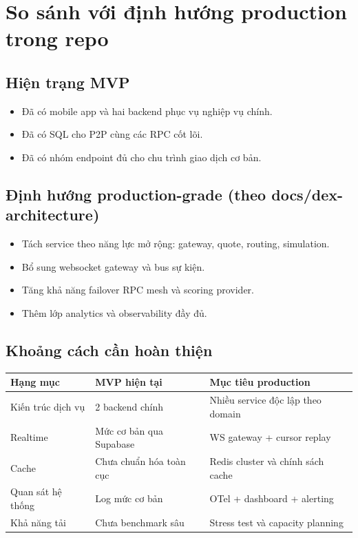 \documentclass[a4paper,12pt]{report}
\begin{document}
\chapter{So sánh với định hướng production trong repo}

\section{Hiện trạng MVP}
\begin{itemize}
    \item Đã có mobile app và hai backend phục vụ nghiệp vụ chính.
    \item Đã có SQL cho P2P cùng các RPC cốt lõi.
    \item Đã có nhóm endpoint đủ cho chu trình giao dịch cơ bản.
\end{itemize}

\section{Định hướng production-grade (theo docs/dex-architecture)}
\begin{itemize}
    \item Tách service theo năng lực mở rộng: gateway, quote, routing, simulation.
    \item Bổ sung websocket gateway và bus sự kiện.
    \item Tăng khả năng failover RPC mesh và scoring provider.
    \item Thêm lớp analytics và observability đầy đủ.
\end{itemize}

\section{Khoảng cách cần hoàn thiện}
\begin{longtable}{|p{4.2cm}|p{4.8cm}|p{4.6cm}|}
\hline
\textbf{Hạng mục} & \textbf{MVP hiện tại} & \textbf{Mục tiêu production} \\
\hline
Kiến trúc dịch vụ & 2 backend chính & Nhiều service độc lập theo domain \\
\hline
Realtime & Mức cơ bản qua Supabase & WS gateway + cursor replay \\
\hline
Cache & Chưa chuẩn hóa toàn cục & Redis cluster và chính sách cache \\
\hline
Quan sát hệ thống & Log mức cơ bản & OTel + dashboard + alerting \\
\hline
Khả năng tải & Chưa benchmark sâu & Stress test và capacity planning \\
\hline
\end{longtable}
\end{document}

